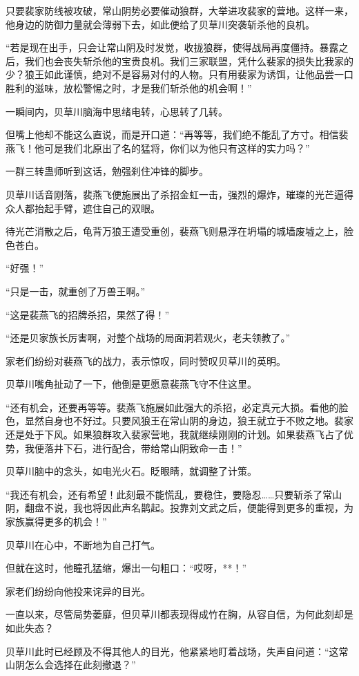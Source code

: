 \begin{this_body}
只要裴家防线被攻破，常山阴势必要催动狼群，大举进攻裴家的营地。这样一来，他身边的防御力量就会薄弱下去，如此便给了贝草川突袭斩杀他的良机。

“若是现在出手，只会让常山阴及时发觉，收拢狼群，使得战局再度僵持。暴露之后，我们也会丧失斩杀他的宝贵良机。我们三家联盟，凭什么裴家的损失比我家的少？狼王如此谨慎，绝对不是容易对付的人物。只有用裴家为诱饵，让他品尝一口胜利的滋味，放松警惕之时，才是我们斩杀他的机会啊！”

一瞬间内，贝草川脑海中思绪电转，心思转了几转。

但嘴上他却不能这么直说，而是开口道：“再等等，我们绝不能乱了方寸。相信裴燕飞！他可是我们北原出了名的猛将，你们以为他只有这样的实力吗？”

一群三转蛊师听到这话，勉强刹住冲锋的脚步。

贝草川话音刚落，裴燕飞便施展出了杀招金虹一击，强烈的爆炸，璀璨的光芒逼得众人都抬起手臂，遮住自己的双眼。

待光芒消散之后，龟背万狼王遭受重创，裴燕飞则悬浮在坍塌的城墙废墟之上，脸色苍白。

“好强！”

“只是一击，就重创了万兽王啊。”

“这是裴燕飞的招牌杀招，果然了得！”

“还是贝家族长厉害啊，对整个战场的局面洞若观火，老夫领教了。”

家老们纷纷对裴燕飞的战力，表示惊叹，同时赞叹贝草川的英明。

贝草川嘴角扯动了一下，他倒是更愿意裴燕飞守不住这里。

“还有机会，还要再等等。裴燕飞施展如此强大的杀招，必定真元大损。看他的脸色，显然自身也不好过。只要风狼王在常山阴的身边，狼王就立于不败之地。裴家还是处于下风。如果狼群攻入裴家营地，我就继续刚刚的计划。如果裴燕飞占了优势，我便落井下石，进行配合，带给常山阴致命一击！”

贝草川脑中的念头，如电光火石。眨眼睛，就调整了计策。

“我还有机会，还有希望！此刻最不能慌乱，要稳住，要隐忍……只要斩杀了常山阴，翻盘不说，我也将因此声名鹊起。投靠刘文武之后，便能得到更多的重视，为家族赢得更多的机会！”

贝草川在心中，不断地为自己打气。

但就在这时，他瞳孔猛缩，爆出一句粗口：“哎呀，**！”

家老们纷纷向他投来诧异的目光。

一直以来，尽管局势萎靡，但贝草川都表现得成竹在胸，从容自信，为何此刻却是如此失态？

贝草川此时已经顾及不得其他人的目光，他紧紧地盯着战场，失声自问道：“这常山阴怎么会选择在此刻撤退？”


\end{this_body}
